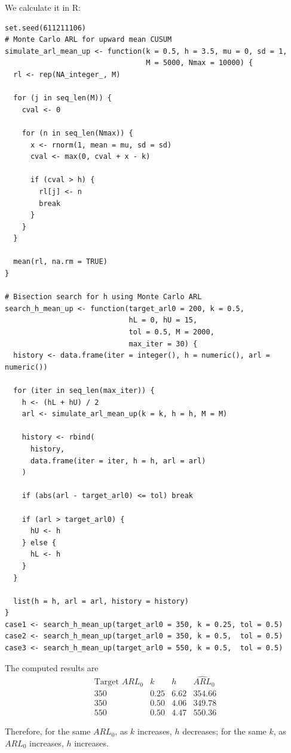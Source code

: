 \documentclass[a4paper, 12pt]{article}  %
\begin{document}
We calculate it in R:
\begin{codeblock}
\begin{verbatim}
set.seed(611211106)
# Monte Carlo ARL for upward mean CUSUM
simulate_arl_mean_up <- function(k = 0.5, h = 3.5, mu = 0, sd = 1,
                                 M = 5000, Nmax = 10000) {
  rl <- rep(NA_integer_, M)

  for (j in seq_len(M)) {
    cval <- 0

    for (n in seq_len(Nmax)) {
      x <- rnorm(1, mean = mu, sd = sd)
      cval <- max(0, cval + x - k)

      if (cval > h) {
        rl[j] <- n
        break
      }
    }
  }

  mean(rl, na.rm = TRUE)
}

# Bisection search for h using Monte Carlo ARL
search_h_mean_up <- function(target_arl0 = 200, k = 0.5,
                             hL = 0, hU = 15,
                             tol = 0.5, M = 2000,
                             max_iter = 30) {
  history <- data.frame(iter = integer(), h = numeric(), arl = numeric())

  for (iter in seq_len(max_iter)) {
    h <- (hL + hU) / 2
    arl <- simulate_arl_mean_up(k = k, h = h, M = M)

    history <- rbind(
      history,
      data.frame(iter = iter, h = h, arl = arl)
    )

    if (abs(arl - target_arl0) <= tol) break

    if (arl > target_arl0) {
      hU <- h
    } else {
      hL <- h
    }
  }

  list(h = h, arl = arl, history = history)
}
case1 <- search_h_mean_up(target_arl0 = 350, k = 0.25, tol = 0.5)
case2 <- search_h_mean_up(target_arl0 = 350, k = 0.5,  tol = 0.5)
case3 <- search_h_mean_up(target_arl0 = 550, k = 0.5,  tol = 0.5)
\end{verbatim}
\end{codeblock}

The computed results are
\[
\begin{array}{c|c|c|c}
\text{Target } ARL_0 & k & h & \widehat{ARL}_0 \\ \hline
350 & 0.25 & 6.62 & 354.66\\
350 & 0.50 & 4.06 & 349.78\\
550 & 0.50 & 4.47 & 550.36
\end{array}
\]

Therefore, for the same \(ARL_0\), as \(k\) increases, \(h\) decreases;
for the same \(k\), as \(ARL_0\) increases, \(h\) increases.
\end{document}
